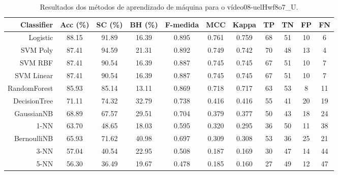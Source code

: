 \begin{table}[!htb]
\centering
\caption{Resultados dos métodos de aprendizado de máquina para o vídeo08-uelHwf8o7_U.}
\label{tab:08-uelHwf8o7_U}
\begin{tabular}{r|c|c|c|c|c|c|c|c|c|c}
\hline\hline
Classifier & Acc (\%) & SC (\%) & BH (\%) & F-medida & MCC & Kappa & TP & TN & FP & FN \\ \hline
Logistic & 88.15 & 91.89 & 16.39 & 0.895 & 0.761 & 0.759 & 68 & 51 & 10 & 6 \\ 
SVM Poly & 87.41 & 94.59 & 21.31 & 0.892 & 0.749 & 0.742 & 70 & 48 & 13 & 4 \\ 
SVM RBF & 87.41 & 90.54 & 16.39 & 0.887 & 0.745 & 0.745 & 67 & 51 & 10 & 7 \\ 
SVM Linear & 87.41 & 90.54 & 16.39 & 0.887 & 0.745 & 0.745 & 67 & 51 & 10 & 7 \\ 
RandomForest & 85.93 & 85.14 & 13.11 & 0.869 & 0.718 & 0.717 & 63 & 53 & 8 & 11 \\ 
DecisionTree & 71.11 & 74.32 & 32.79 & 0.738 & 0.416 & 0.416 & 55 & 41 & 20 & 19 \\ 
GaussianNB & 68.89 & 67.57 & 29.51 & 0.704 & 0.379 & 0.377 & 50 & 43 & 18 & 24 \\ 
1-NN & 63.70 & 48.65 & 18.03 & 0.595 & 0.320 & 0.295 & 36 & 50 & 11 & 38 \\ 
BernoulliNB & 65.93 & 71.62 & 40.98 & 0.697 & 0.309 & 0.308 & 53 & 36 & 25 & 21 \\ 
3-NN & 57.04 & 40.54 & 22.95 & 0.508 & 0.187 & 0.169 & 30 & 47 & 14 & 44 \\ 
5-NN & 56.30 & 36.49 & 19.67 & 0.478 & 0.185 & 0.160 & 27 & 49 & 12 & 47 \\ 
\hline\hline
\end{tabular}
\end{table}
